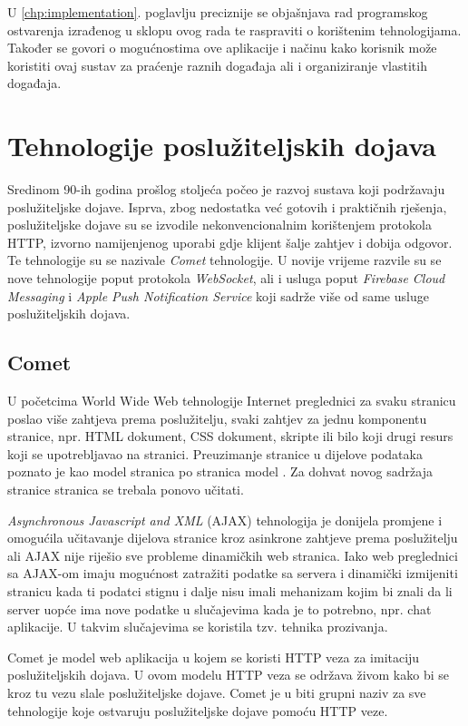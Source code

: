 \documentclass[times, utf8, zavrsni]{fer}
\begin{document}
U \ref{chp:implementation}. poglavlju preciznije se objašnjava rad programskog ostvarenja izrađenog u sklopu ovog rada te raspraviti o korištenim tehnologijama. Također se govori o mogućnostima ove aplikacije i načinu kako korisnik može koristiti ovaj sustav za praćenje raznih događaja ali i organiziranje vlastitih događaja.

\chapter{Tehnologije poslužiteljskih dojava}
\label{chp:technologies}

Sredinom 90-ih godina prošlog stoljeća počeo je razvoj sustava koji podržavaju poslužiteljske dojave. Isprva, zbog nedostatka već gotovih i praktičnih rješenja, poslužiteljske dojave su se izvodile nekonvencionalnim korištenjem protokola HTTP, izvorno namijenjenog uporabi gdje klijent šalje zahtjev i dobija odgovor. Te tehnologije su se nazivale {\em Comet} tehnologije. U novije vrijeme razvile su se nove tehnologije poput protokola {\em WebSocket}, ali i usluga poput {\em Firebase Cloud Messaging} i {\em Apple Push Notification Service} koji sadrže više od same usluge poslužiteljskih dojava.

\section{Comet}
U početcima World Wide Web tehnologije Internet preglednici za svaku stranicu poslao više zahtjeva prema poslužitelju, svaki zahtjev za jednu komponentu stranice, npr. HTML dokument, CSS dokument, skripte ili bilo koji drugi resurs koji se upotrebljavao na stranici. Preuzimanje stranice u dijelove podataka poznato je kao model stranica po stranica model . Za dohvat novog sadržaja stranice stranica se trebala ponovo učitati.

{\em Asynchronous Javascript and XML} (AJAX) tehnologija je donijela promjene i omogućila učitavanje dijelova stranice kroz asinkrone zahtjeve prema poslužitelju ali AJAX nije riješio sve probleme dinamičkih web stranica. Iako web preglednici sa AJAX-om imaju mogućnost zatražiti podatke sa servera i dinamički izmijeniti stranicu kada ti podatci stignu i dalje nisu imali mehanizam kojim bi znali da li server uopće ima nove podatke u slučajevima kada je to potrebno, npr. chat aplikacije. U takvim slučajevima se koristila tzv. tehnika prozivanja.\citep{gravelle2009comet}

Comet je model web aplikacija u kojem se koristi HTTP veza za imitaciju poslužiteljskih dojava. U ovom modelu HTTP veza se održava živom kako bi se kroz tu vezu slale poslužiteljske dojave. Comet je u biti grupni naziv za sve tehnologije koje ostvaruju poslužiteljske dojave pomoću HTTP veze.
\end{document}
